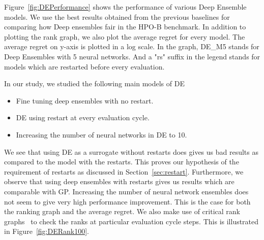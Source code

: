 \documentclass[12pt, twoside, ngerman]{report}
\begin{document}
Figure~\ref{fig:DEPerformance} shows the performance of various Deep Ensemble models.
We use the best results obtained from the previous baselines for comparing how Deep ensembles fair in the HPO-B benchmark.
In addition to plotting the rank graph,  we also plot the  average regret for every model.
The average regret on y-axis is plotted in a log scale.
In the graph,  DE\_M5 stands for Deep Ensembles with 5 neural networks.
And a "rs" suffix in the legend stands for models which are restarted before every evaluation.

In our study,  we studied the following main models of DE
\begin{itemize}
\item Fine tuning deep ensembles with no restart.
\item DE using restart at every evaluation cycle.
\item Increasing the number of neural networks in DE to 10.
\end{itemize}

We see that using DE as a surrogate without restarts does gives us bad results as compared to the model with the restarts.
This proves our hypothesis of the requirement of restarts as discussed in Section~\ref{sec:restart}.
Furthermore,  we observe that using deep ensembles with restarts gives us results which are comparable with GP.
Increasing the number of neural network ensembles does not seem to give very high performance improvement.
This is the case for both the ranking graph and the average regret.
We also make use of critical rank graphs~\cite{pineda2021hpob} to check the ranks at particular evaluation cycle steps.
This is illustrated in Figure~\ref{fig:DERank100}.
\end{document}
